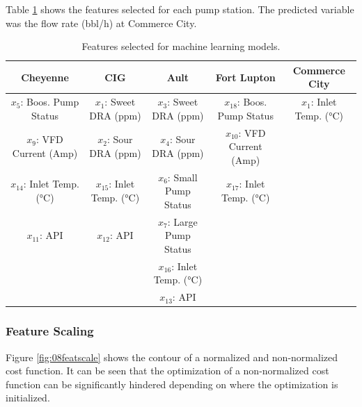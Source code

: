 Table \ref{tab:08featselect} shows the features selected for each pump station. The predicted variable was the flow rate (bbl/h) at Commerce City.

\begin{table}[h]
    \centering
    {\tiny
    {
    \begin{tabular}{ c | c | c | c | c}
        Cheyenne                       & CIG                      & Ault                        & Fort Lupton                    & Commerce City \\
        \hline
        $x_5$: Boos. Pump Status       &  $x_1$: Sweet DRA (ppm)  &  $x_3$: Sweet DRA (ppm)     &  $x_{18}$: Boos. Pump Status   &  $x_1$: Inlet Temp. (°C) \\
        
        $x_9$: VFD Current (Amp)       &  $x_2$: Sour DRA (ppm)   &  $x_4$: Sour DRA (ppm)      & $x_{10}$: VFD Current (Amp)      & \\
        
        $x_{14}$: Inlet Temp. (°C)     &  $x_{15}$: Inlet Temp. (°C) &  $x_6$: Small Pump Status &  $x_{17}$: Inlet Temp. (°C)  & \\
        
        $x_{11}$: API                   &  $x_{12}$: API          &  $x_7$: Large Pump Status   &             
        & \\
        
                                       &                          &  $x_{16}$: Inlet Temp. (°C)  &             
        & \\
        
                                       &                          &  $x_{13}$: API               &       
        & \\
        
    \end{tabular}}}
    \caption{Features selected for machine learning models.}
    \label{tab:08featselect}
\end{table}

\subsubsection{Feature Scaling}
Figure \ref{fig:08featscale} shows the contour of a normalized and non-normalized cost function. It can be seen that the optimization of a non-normalized cost function can be significantly hindered depending on where the optimization is initialized.

